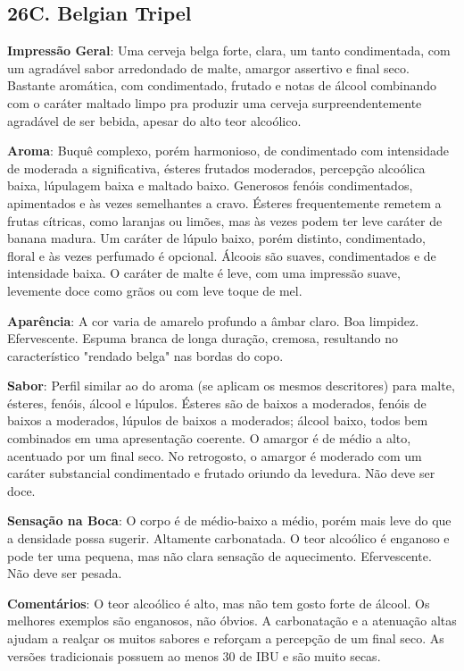 \subsection*{26C. Belgian Tripel}
\textbf{Impressão Geral}: Uma cerveja belga forte, clara, um tanto condimentada, com um agradável sabor arredondado de malte, amargor assertivo e final seco. Bastante aromática, com condimentado, frutado e notas de álcool combinando com o caráter maltado limpo pra produzir uma cerveja surpreendentemente agradável de ser bebida, apesar do alto teor alcoólico.

\textbf{Aroma}: Buquê complexo, porém harmonioso, de condimentado com intensidade de moderada a significativa, ésteres frutados moderados, percepção alcoólica baixa, lúpulagem baixa e maltado baixo. Generosos fenóis condimentados, apimentados e às vezes semelhantes a cravo. Ésteres frequentemente remetem a frutas cítricas, como laranjas ou limões, mas às vezes podem ter leve caráter de banana madura. Um caráter de lúpulo baixo, porém distinto, condimentado, floral e às vezes perfumado é opcional. Álcoois são suaves, condimentados e de intensidade baixa. O caráter de malte é leve, com uma impressão suave, levemente doce como grãos ou com leve toque de mel.

\textbf{Aparência}: A cor varia de amarelo profundo a âmbar claro. Boa limpidez. Efervescente. Espuma branca de longa duração, cremosa, resultando no característico "rendado belga" nas bordas do copo.

\textbf{Sabor}: Perfil similar ao do aroma (se aplicam os mesmos descritores) para malte, ésteres, fenóis, álcool e lúpulos. Ésteres são de baixos a moderados, fenóis de baixos a moderados, lúpulos de baixos a moderados; álcool baixo, todos bem combinados em uma apresentação coerente. O amargor é de médio a alto, acentuado por um final seco. No retrogosto, o amargor é moderado com um caráter substancial condimentado e frutado oriundo da levedura. Não deve ser doce.

\textbf{Sensação na Boca}: O corpo é de médio-baixo a médio, porém mais leve do que a densidade possa sugerir. Altamente carbonatada. O teor alcoólico é enganoso e pode ter uma pequena, mas não clara sensação de aquecimento. Efervescente. Não deve ser pesada.

\textbf{Comentários}: O teor alcoólico é alto, mas não tem gosto forte de álcool. Os melhores exemplos são enganosos, não óbvios. A carbonatação e a atenuação altas ajudam a realçar os muitos sabores e reforçam a percepção de um final seco. As versões tradicionais possuem ao menos 30 de IBU e são muito secas.

